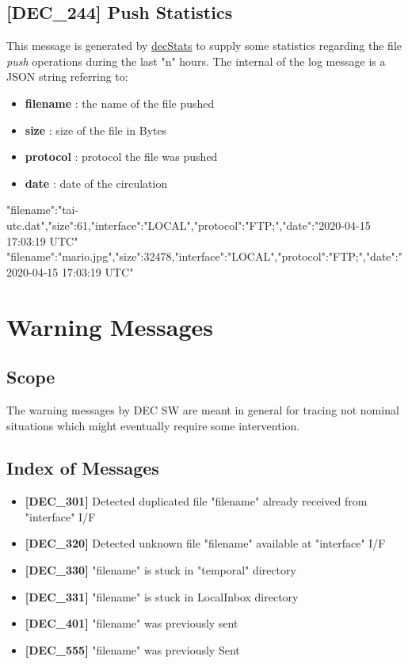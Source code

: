 \documentclass[dec_sum_main.tex]{subfiles}
\begin{document}
\subsection{[DEC\_244] Push Statistics}
This message is generated by \hyperref[decStats]{decStats} to supply some statistics regarding the file \textit{push} operations during the last "n" hours.\newline
The internal of the log message is a JSON string referring to:
\begin{itemize}
	\item \textbf{filename} : the name of the file pushed
	\item \textbf{size} : size of the file in Bytes
	\item \textbf{protocol} : protocol the file was pushed
	\item \textbf{date} : date of the circulation
\end{itemize}
\begin{verbnobox}[\fontsize{8pt}{8pt}\selectfont]
{"filename":"tai-utc.dat","size":61,"interface":"LOCAL","protocol":"FTP;","date":"2020-04-15 17:03:19 UTC"}
{"filename":"mario.jpg","size":32478,"interface":"LOCAL","protocol":"FTP;","date":"2020-04-15 17:03:19 UTC"}
\end{verbnobox}



\newpage

\section{Warning Messages}

\subsection{Scope}
The warning messages by DEC SW are meant in general for tracing not nominal situations which might eventually require some intervention.

\subsection{Index of Messages}

\begin{itemize}
	\item \textbf{[DEC\_301]} Detected duplicated file "filename" already received from "interface" I/F
	\item \textbf{[DEC\_320]} Detected unknown file "filename" available at "interface" I/F
	\item \textbf{[DEC\_330]} "filename" is stuck in "temporal" directory
	\item \textbf{[DEC\_331]} "filename" is stuck in LocalInbox directory
	\item \textbf{[DEC\_401]} "filename" was previously sent
	\item \textbf{[DEC\_555]} "filename" was previously Sent
\end{itemize}
\end{document}
